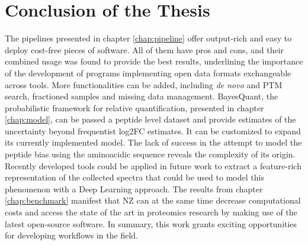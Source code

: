 \chapter{Conclusion of the Thesis}
\label{chap:conclusion}

The pipelines presented in chapter \ref{chap:pipeline} offer output-rich and easy to deploy cost-free pieces of software. All of them have pros and cons, and their combined usage was found to provide the best results, underlining the importance of the development of programs implementing open data formats exchangeable across tools. More functionalities can be added, including \textit{de novo} and \ac{PTM} search, fractioned samples and missing data management. BayesQuant, the probabilistic framework for relative quantification, presented in chapter \ref{chap:model}, can be passed a peptide level dataset and provide estimates of the uncertainty beyond frequentist \ac{log2FC} estimates. It can be customized to expand its currently implemented model. The lack of success in the attempt to model the peptide bias using the aminoacidic sequence reveals the complexity of its origin. Recently developed tools  could be applied in future work to extract a feature-rich representation of the collected spectra that could be used to model this phenomenon with a Deep Learning approach. The results from chapter \ref{chap:benchmark} manifest that \ac{NZ} can at the same time decrease computational costs and access the state of the art in proteomics research by making use of the latest open-source software. In summary, this work grants exciting opportunities for developing workflows in the field.